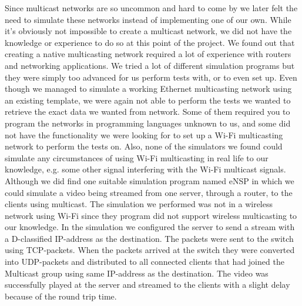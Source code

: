 \documentclass[9pt,a4paper]{acmproc}
\begin{document}
Since multicast networks are so uncommon and hard to come by we later felt the need to simulate these networks instead of implementing one of our own. While it's obviously not impossible to create a multicast network, we did not have the knowledge or experience to do so at this point of the project. We found out that creating a native multicasting network required a lot of experience with routers and networking applications. We tried a lot of different simulation programs but they were simply too advanced for us perform tests with, or to even set up. Even though we managed to simulate a working Ethernet multicasting network using an existing template, we were again not able to perform the tests we wanted to retrieve the exact data we wanted from network. Some of them required you to program the networks in programming languages unknown to us, and some did not have the functionality we were looking for to set up a Wi-Fi multicasting network to perform the tests on. Also, none of the simulators we found could simulate any circumstances of using Wi-Fi multicasting in real life to our knowledge, e.g. some other signal interfering with the Wi-Fi multicast signals.
Although we did find one suitable simulation program named eNSP in which we could simulate a video being streamed from one server, through a router, to the clients using multicast. The simulation we performed was not in a wireless network using Wi-Fi since they program did not support wireless multicasting to our knowledge. In the simulation we configured the server to send a stream with a D-classified IP-address as the destination. The packets were sent to the switch using TCP-packets. When the packets arrived at the switch they were converted into UDP-packets and distributed to all connected clients that had joined the Multicast group using same IP-address as the destination. The video was successfully played at the server and streamed to the clients with a slight delay because of the round trip time.
\end{document}

